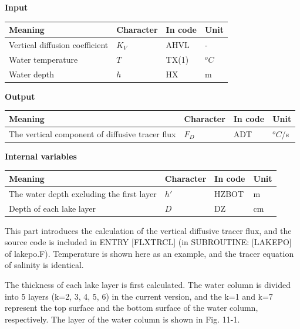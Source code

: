 \textbf{Input}

\begin{longtable}[]{@{}llll@{}}
\toprule\noalign{}
Meaning & Character & In code & Unit \\
\midrule\noalign{}
\endhead
\bottomrule\noalign{}
\endlastfoot
Vertical diffusion coefficient & \(K_{V}\) & AHVL & - \\
Water temperature & \(T\) & TX(1) & \(^{o}C\) \\
Water depth & \(h\) & HX & m \\
\end{longtable}

\textbf{Output}

\begin{longtable}[]{@{}llll@{}}
\toprule\noalign{}
Meaning & Character & In code & Unit \\
\midrule\noalign{}
\endhead
\bottomrule\noalign{}
\endlastfoot
The vertical component of diffusive tracer flux & \(F_{D}\) & ADT & \(^{o}C\)/s \\
\end{longtable}

\textbf{Internal variables}

\begin{longtable}[]{@{}llll@{}}
\toprule\noalign{}
Meaning & Character & In code & Unit \\
\midrule\noalign{}
\endhead
\bottomrule\noalign{}
\endlastfoot
The water depth excluding the first layer & \(h'\) & HZBOT & m \\
Depth of each lake layer & \(D\) & DZ & cm \\
\end{longtable}

This part introduces the calculation of the vertical diffusive tracer flux, and the source code is included in ENTRY {[}FLXTRCL{]} (in SUBROUTINE: {[}LAKEPO{]} of lakepo.F). Temperature is shown here
as an example, and the tracer equation of salinity is identical.

The thickness of each lake layer is first calculated. The water column is divided into 5 layers (k=2, 3, 4, 5, 6) in the current version, and the k=1 and k=7 represent the top surface and the bottom
surface of the water column, respectively. The layer of the water column is shown in Fig. 11-1.

